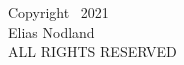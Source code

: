 \begin{center}
\null\vfill
\noindent
Copyright \textcopyright\ 2021 \\
Elias Nodland \\
ALL RIGHTS RESERVED \\
\vspace{2in}
\end{center}

